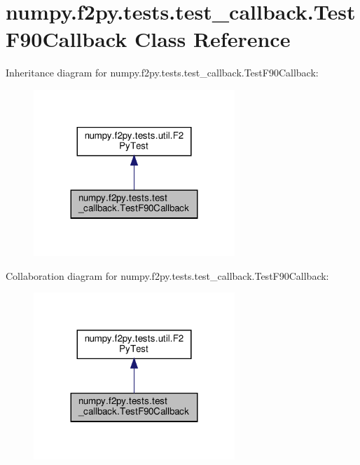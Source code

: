 \hypertarget{classnumpy_1_1f2py_1_1tests_1_1test__callback_1_1TestF90Callback}{}\section{numpy.\+f2py.\+tests.\+test\+\_\+callback.\+Test\+F90\+Callback Class Reference}
\label{classnumpy_1_1f2py_1_1tests_1_1test__callback_1_1TestF90Callback}


Inheritance diagram for numpy.\+f2py.\+tests.\+test\+\_\+callback.\+Test\+F90\+Callback\+:
\nopagebreak
\begin{figure}[H]
\begin{center}
\leavevmode
\includegraphics[width=215pt]{classnumpy_1_1f2py_1_1tests_1_1test__callback_1_1TestF90Callback__inherit__graph}
\end{center}
\end{figure}


Collaboration diagram for numpy.\+f2py.\+tests.\+test\+\_\+callback.\+Test\+F90\+Callback\+:
\nopagebreak
\begin{figure}[H]
\begin{center}
\leavevmode
\includegraphics[width=215pt]{classnumpy_1_1f2py_1_1tests_1_1test__callback_1_1TestF90Callback__coll__graph}
\end{center}
\end{figure}
